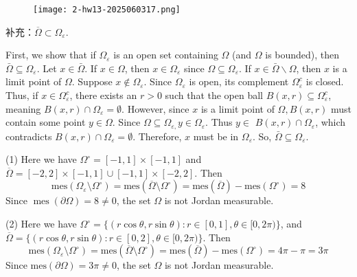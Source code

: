 \begin{exercise}
\begin{figure}[H]
\centering
\texttt{[image: 2-hw13-2025060317.png]}
\label{}
\end{figure}
补充：$\overline{\Omega}\subset \Omega_{\varepsilon}$.
\end{exercise}
First, we show that if $\Omega_{\varepsilon}$ is an open set containing $\Omega$ (and $\Omega$ is bounded), then $\bar{\Omega} \subseteq \Omega_{\varepsilon}$. Let $x \in \bar{\Omega}$. If $x \in \Omega$, then $x \in \Omega_{\varepsilon}$ since $\Omega \subseteq \Omega_{\varepsilon}$. If $x \in \bar{\Omega} \backslash \Omega$, then $x$ is a limit point of $\Omega$. Suppose $x \notin \Omega_{\varepsilon}$. Since $\Omega_{\varepsilon}$ is open, its complement $\Omega_{\varepsilon}^c$ is closed. Thus, if $x \in \Omega_{\varepsilon}^c$, there exists an $r>0$ such that the open ball $B(x, r) \subseteq \Omega_{\varepsilon}^c$, meaning $B(x, r) \cap \Omega_{\varepsilon}=\emptyset$. However, since $x$ is a limit point of $\Omega, B(x, r)$ must contain some point $y \in \Omega$. Since $\Omega \subseteq \Omega_{\varepsilon,} y \in \Omega_{\varepsilon}$. Thus $y \in$ $B(x, r) \cap \Omega_{\varepsilon}$, which contradicts $B(x, r) \cap \Omega_{\varepsilon}=\emptyset$. Therefore, $x$ must be in $\Omega_{\varepsilon}$. So, $\bar{\Omega} \subseteq \Omega_{\varepsilon}$.

(1)
Here we have $\Omega^{\circ}=[-1,1]\times[-1,1]$ and $\overline{\Omega}=[-2,2]\times[-1,1]\cup[-1,1]\times[-2,2]$. Then
\[
\text{mes}(\Omega_{\varepsilon}\setminus \Omega^{\circ })=\text{mes}(\overline{\Omega}\setminus \Omega^{\circ })=\text{mes}(\overline{\Omega})-\text{mes}(\Omega^{\circ })=8
\]
Since $\operatorname{mes}(\partial \Omega)=8 \neq 0$, the set $\Omega$ is not Jordan measurable.

(2)
Here we have $\Omega^{\circ}=\{ (r\cos\theta,r\sin \theta) :r\in[0,1],\theta\in[0,2\pi)\}$, and $\overline{\Omega}=\{ (r\cos\theta,r\sin\theta):r\in[0,2],\theta\in[0,2\pi) \}$. Then
\[
\text{mes}(\Omega_{\varepsilon}\setminus \Omega^{\circ })=\text{mes}(\overline{\Omega}\setminus \Omega^{\circ })=\text{mes}(\overline{\Omega})-\text{mes}(\Omega^{\circ })=4\pi-\pi=3\pi
\]
Since $\text{mes}(\partial \Omega)=3\pi\neq0$, the set $\Omega$ is not Jordan measurable.

